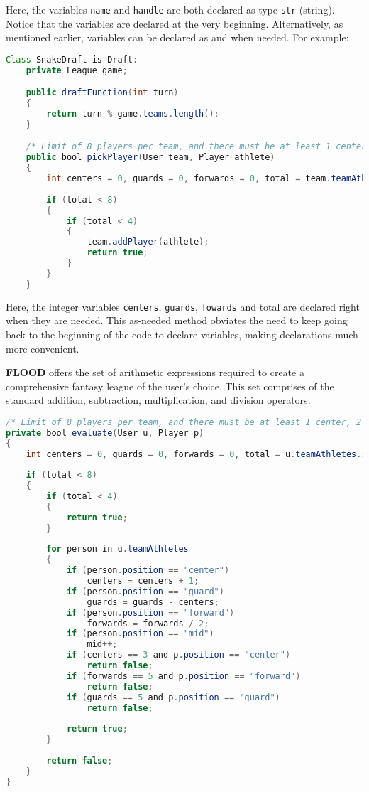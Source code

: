 \documentclass[12pt]{report}
\begin{document}
\begin{doublespace}
Here, the variables \texttt{name} and \texttt{handle} are both declared as type \texttt{str} (string). Notice that the variables are declared at the very beginning.  Alternatively, as mentioned earlier, variables can be declared as and when needed. For example:
\end{doublespace}

\begin{lstlisting}[language=Java,label=some-code,caption=SnakeDraft.fld]
Class SnakeDraft is Draft:
	private League game;

	public draftFunction(int turn)
	{
		return turn % game.teams.length();
	}

	/* Limit of 8 players per team, and there must be at least 1 center, 2 guards and 2 forwards per team. */
	public bool pickPlayer(User team, Player athlete)
	{
		int centers = 0, guards = 0, forwards = 0, total = team.teamAthletes.size();
		
		if (total < 8)
		{
			if (total < 4)
			{
				team.addPlayer(athlete);
				return true;
			}
		}
	}
\end{lstlisting}

\begin{doublespace}
Here, the integer variables \texttt{centers}, \texttt{guards}, \texttt{fowards} and total are declared right when they are needed. This as-needed method obviates the need to keep going back to the beginning of the code to declare variables, making declarations much more convenient.

\textbf{FLOOD} offers the set of arithmetic expressions required to create a comprehensive fantasy league of the user's choice. This set comprises of the standard addition, subtraction, multiplication, and division operators. 
\end{doublespace}

\begin{lstlisting}[language=Java,label=some-code,caption=Arithmetic expressions]
/* Limit of 8 players per team, and there must be at least 1 center, 2 guards and 2 forwards per team. */
private bool evaluate(User u, Player p)
{
	int centers = 0, guards = 0, forwards = 0, total = u.teamAthletes.size();
	
	if (total < 8)
	{
		if (total < 4)
		{
			return true;
		}
		
		for person in u.teamAthletes
		{
			if (person.position == "center")
				centers = centers + 1;
			if (person.position == "guard")
				guards = guards - centers;
			if (person.position == "forward")
				forwards = forwards / 2;
			if (person.position == "mid")
				mid++;
			if (centers == 3 and p.position == "center")
				return false;
			if (forwards == 5 and p.position == "forward")
				return false;
			if (guards == 5 and p.position == "guard")
				return false;
		
			return true;
		}
	
		return false;
	}
}
\end{lstlisting}
\end{document}
